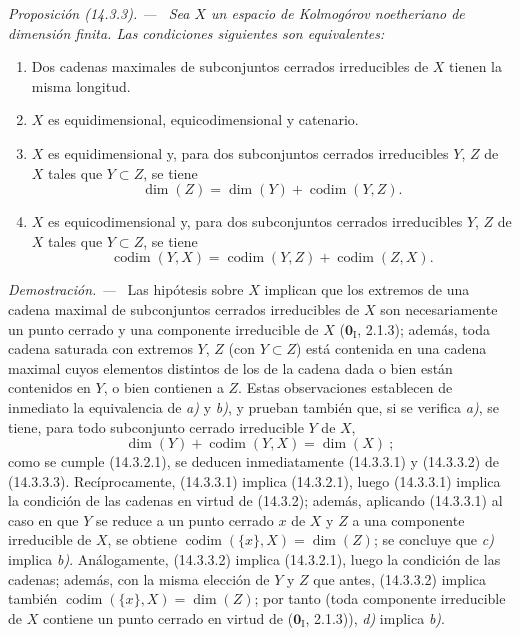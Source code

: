 \documentclass[10pt,oneside]{book}
\makeatletter
\newcommand{\setmanualcurrentlabel}[1]{\def\@currentlabel{#1}}
\newenvironment{proposition}[1][]{%
  \setmanualcurrentlabel{#1}\par\medskip\noindent\itshape Proposición (#1). ---\ }{\par}
\newenvironment{proof}{%
  \par\medskip\noindent\textit{Demostración. ---\ }}{\par}
\makeatother
\begin{document}
\begin{proposition}[14.3.3]
\label{0.14.3.3-es}
Sea $X$ un espacio de Kolmogórov noetheriano de dimensión finita. Las
condiciones siguientes son equivalentes:
\begin{enumerate}
  \item[\rm(a)] Dos cadenas maximales de subconjuntos cerrados irreducibles de
  $X$ tienen la misma longitud.
  \item[\rm(b)] $X$ es equidimensional, equicodimensional y catenario.
  \item[\textup{c)}] $X$ es equidimensional y, para dos subconjuntos cerrados
  irreducibles $Y$, $Z$ de $X$ tales que $Y\subset Z$, se tiene
  \[
    \dim(Z)=\dim(Y)+\operatorname{codim}(Y,Z).
    \tag{14.3.3.1}\label{0.14.3.3.1-es}
  \]
  \item[\textup{d)}] $X$ es equicodimensional y, para dos subconjuntos cerrados
  irreducibles $Y$, $Z$ de $X$ tales que $Y\subset Z$, se tiene
  \[
    \operatorname{codim}(Y,X)=
    \operatorname{codim}(Y,Z)+\operatorname{codim}(Z,X).
    \tag{14.3.3.2}\label{0.14.3.3.2-es}
  \]
\end{enumerate}
\end{proposition}

\begin{proof}
Las hipótesis sobre $X$ implican que los extremos de una cadena maximal de
subconjuntos cerrados irreducibles de $X$ son necesariamente un punto cerrado y
una componente irreducible de $X$ ($\mathbf 0_{\mathrm I}$, 2.1.3); además, toda
cadena saturada con extremos $Y$, $Z$ (con $Y\subset Z$) está contenida en una
cadena maximal cuyos elementos distintos de los de la cadena dada o bien están
contenidos en $Y$, o bien contienen a $Z$. Estas observaciones establecen de
inmediato la equivalencia de \emph{a)} y \emph{b)}, y prueban también que, si se verifica \emph{a)},
se tiene, para todo subconjunto cerrado irreducible $Y$ de $X$,
\[
  \dim(Y)+\operatorname{codim}(Y,X)=\dim(X)~;
  \tag{14.3.3.3}\label{0.14.3.3.3-es}
\]
como se cumple (14.3.2.1), se deducen inmediatamente (14.3.3.1) y (14.3.3.2)
de (14.3.3.3). Recíprocamente, (14.3.3.1) implica (14.3.2.1), luego
(14.3.3.1) implica la condición de las cadenas en virtud de (14.3.2); además,
aplicando (14.3.3.1) al caso en que $Y$ se reduce a un punto cerrado $x$ de $X$
y $Z$ a una componente irreducible de $X$, se obtiene
$\operatorname{codim}(\{x\},X)=\dim(Z)$; se concluye que \emph{c)} implica \emph{b)}.
Análogamente, (14.3.3.2) implica (14.3.2.1), luego la condición de las cadenas;
además, con la misma elección de $Y$ y $Z$ que antes, (14.3.3.2) implica
también $\operatorname{codim}(\{x\},X)=\dim(Z)$; por tanto (toda componente
irreducible de $X$ contiene un punto cerrado en virtud de ($\mathbf 0_{\mathrm I}$,
2.1.3)), \emph{d)} implica \emph{b)}.
\end{proof}
\end{document}
